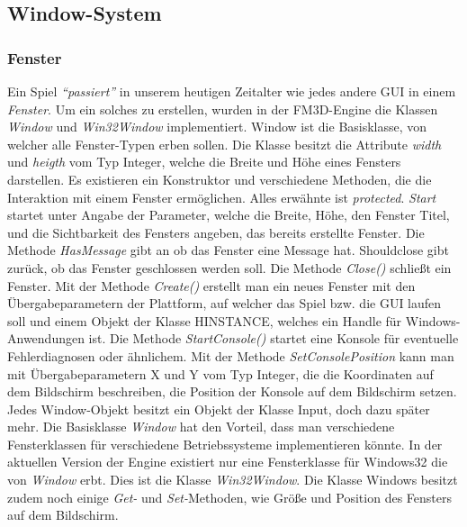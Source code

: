 \subsection{Window-System}

\subsubsection{Fenster}
Ein Spiel \textit{"`passiert"'} in unserem heutigen Zeitalter wie jedes andere GUI in einem \textit{Fenster}. Um ein solches zu erstellen, wurden in der FM3D-Engine die Klassen \textit{Window} und \textit{Win32Window} implementiert.
Window ist die Basisklasse, von welcher alle Fenster-Typen erben sollen.
Die Klasse besitzt die Attribute \textit{width} und \textit{heigth} vom Typ Integer, welche die Breite und Höhe eines Fensters darstellen.
Es existieren ein Konstruktor und verschiedene Methoden, die die Interaktion mit einem Fenster ermöglichen. Alles erwähnte ist \textit{protected}.
\textit{Start} startet unter Angabe der Parameter, welche die Breite, Höhe, den Fenster Titel, und die Sichtbarkeit des Fensters angeben, das bereits erstellte Fenster.
Die Methode \textit{HasMessage} gibt an ob das Fenster eine Message hat. Shouldclose gibt zurück, ob das Fenster geschlossen werden soll.
Die Methode \textit{Close()} schließt ein Fenster. Mit der Methode \textit{Create()} erstellt man ein neues Fenster mit den Übergabeparametern der Plattform, auf welcher das Spiel bzw. die GUI laufen soll und einem Objekt der Klasse HINSTANCE, welches ein Handle für Windows-Anwendungen ist. Die Methode \textit{StartConsole()} startet eine Konsole für eventuelle Fehlerdiagnosen oder ähnlichem. Mit der Methode \textit{SetConsolePosition} kann man mit Übergabeparametern X und Y vom Typ Integer, die die Koordinaten auf dem Bildschirm beschreiben, die Position der Konsole auf dem Bildschirm setzen.
Jedes Window-Objekt besitzt ein Objekt der Klasse Input, doch dazu später mehr. Die Basisklasse \textit{Window} hat den Vorteil, dass man verschiedene Fensterklassen für verschiedene Betriebssysteme implementieren könnte. In der aktuellen Version der Engine existiert nur eine Fensterklasse für Windows32 die von \textit{Window} erbt. Dies ist die Klasse \textit{Win32Window}. Die Klasse Windows besitzt zudem noch einige \textit{Get-} und \textit{Set-}Methoden, wie Größe und Position des Fensters auf dem Bildschirm.

